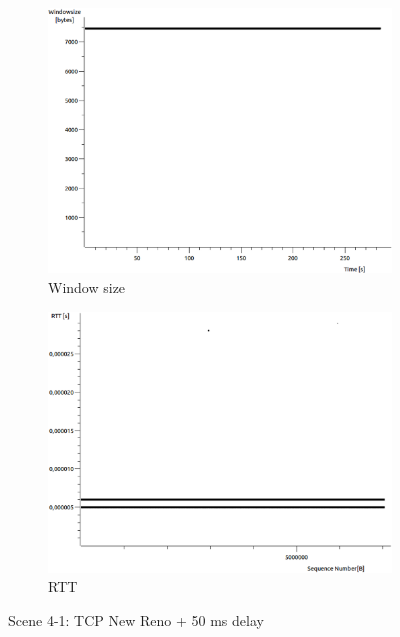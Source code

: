 \documentclass[conference,a4paper]{IEEEtran}
\begin{document}
\begin{figure}
\begin{subfigure}[b]{0.2\textwidth}
  \includegraphics[width=\textwidth]{s4-1_wnd}
  \caption{Window size}
 \end{subfigure}
 \begin{subfigure}[b]{0.2\textwidth}
  \includegraphics[width=\textwidth]{s4-1_rtt}
  \caption{RTT}
 \end{subfigure}
 \caption{Scene 4-1: TCP New Reno + 50 ms delay}
\end{figure}
\end{document}
